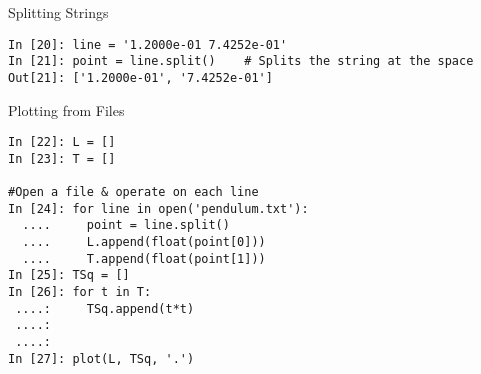 \documentclass[12pt]{article}
\begin{document}
Splitting Strings
\begin{lstlisting}
In [20]: line = '1.2000e-01 7.4252e-01'
In [21]: point = line.split()    # Splits the string at the space
Out[21]: ['1.2000e-01', '7.4252e-01']
\end{lstlisting}

Plotting from Files
\begin{lstlisting}
In [22]: L = []
In [23]: T = []

#Open a file & operate on each line
In [24]: for line in open('pendulum.txt'):  
  ....     point = line.split()
  ....     L.append(float(point[0]))
  ....     T.append(float(point[1]))
In [25]: TSq = []
In [26]: for t in T:
 ....:     TSq.append(t*t)
 ....:     
 ....:     
In [27]: plot(L, TSq, '.')
\end{lstlisting}
\end{document}
